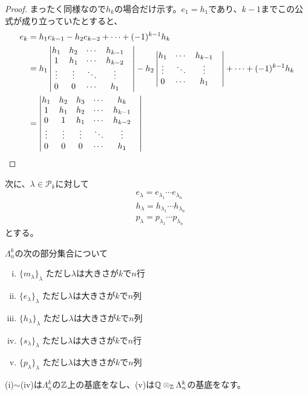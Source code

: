 \documentclass{ltjsreport}
\begin{document}
\begin{proof}
  まったく同様なので$h_k$の場合だけ示す。$e_1=h_1$であり、$k-1$までこの公式が成り立っていたとすると、
  \begin{align*}
    e_k&=h_1e_{k-1}-h_2e_{k-2}+\cdots+(-1)^{k-1}h_k \\
    &=h_1\begin{vmatrix} 
      h_1&h_2&\cdots&h_{k-1}\\
      1&h_1&\cdots&h_{k-2}\\
      \vdots&\vdots&\ddots&\vdots&\\
      0&0&\cdots&h_1
     \end{vmatrix}-h_2\begin{vmatrix} 
      h_1&\cdots&h_{k-1}\\
      \vdots&\ddots&\vdots&\\
      0&\cdots&h_1
     \end{vmatrix}+\cdots+(-1)^{k-1}h_k\\
    &=\begin{vmatrix} 
      h_1&h_2&h_3&\cdots&h_k\\
      1&h_1&h_2&\cdots&h_{k-1}\\
      0&1&h_1&\cdots&h_{k-2}\\
      \vdots&\vdots&\vdots&\ddots&\vdots&\\
      0&0&0&\cdots&h_1
     \end{vmatrix}
  \end{align*}
\end{proof}

次に、$\lambda\in\mathcal{P}_k$に対して
\begin{align*}
  &e_\lambda=e_{\lambda_1}\cdots e_{\lambda_n}\\
  &h_\lambda=h_{\lambda_1}\cdots h_{\lambda_n}\\
  &p_\lambda=p_{\lambda_1}\cdots p_{\lambda_n}
\end{align*}
とする。

\begin{prop}\label{various_basis}
  $\Lambda^k_n$の次の部分集合について
  \begin{enumerate}[(i)]
    \item $\{m_\lambda\}_\lambda$ ただし$\lambda$は大きさが$k$で$n$行
    \item $\{e_\lambda\}_\lambda$ ただし$\lambda$は大きさが$k$で$n$列
    \item $\{h_\lambda\}_\lambda$ ただし$\lambda$は大きさが$k$で$n$列
    \item $\{s_\lambda\}_\lambda$ ただし$\lambda$は大きさが$k$で$n$行
    \item $\{p_\lambda\}_\lambda$ ただし$\lambda$は大きさが$k$で$n$列
  \end{enumerate}
  (i)$\sim$(iv)は$\Lambda^k_n$の$\mathbb{Z}$上の基底をなし、(v)は$\mathbb{Q}\otimes_{\mathbb{Z}}\Lambda^k_n$の基底をなす。
\end{prop}
\end{document}
